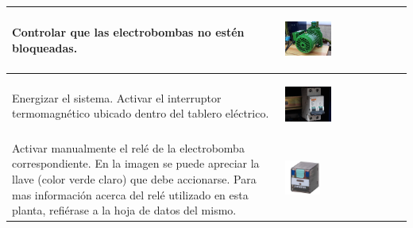 \begin{table}[H]
\centering
\renewcommand*{\arraystretch}{0.01}
\begin{tabular}{*{2}{m{}}}
\hline
  Controlar que las electrobombas no estén bloqueadas.
  &\begin{center}
    \includegraphics[width=0.4\textwidth]
      {Anexos/images/bombaBottom.JPG}
  \end{center}\\
\hline
    Energizar el sistema. Activar el interruptor termomagnético ubicado dentro
    del tablero eléctrico.
    &\begin{center}
      \includegraphics[width=0.4\textwidth]
	{Anexos/images/disyuntor.JPG}
    \end{center}\\
\hline
    Activar manualmente el relé de la electrobomba correspondiente.
    En la imagen se
    puede apreciar la llave (color verde claro) que debe accionarse. Para mas 
    información acerca del relé utilizado en esta planta, refiérase a la
    hoja de datos del mismo.
    &\begin{center}
      \includegraphics[width=0.3\textwidth]{Anexos/images/rele.pdf}
    \end{center}\\
\hline
\end{tabular}
\end{table}

